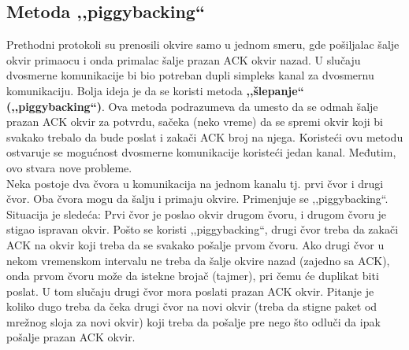 \documentclass[a4paper]{article}
\begin{document}
    \subsection{Metoda ,,piggybacking``}
        Prethodni protokoli su prenosili okvire samo u jednom smeru, gde pošiljalac šalje 
        okvir primaocu i onda primalac šalje prazan ACK okvir nazad. U slučaju dvosmerne komunikacije
        bi bio potreban dupli simpleks kanal za dvosmernu komunikaciju. Bolja ideja je da se
        koristi metoda \textbf{,,šlepanje`` (,,piggybacking``)}. Ova metoda podrazumeva da umesto da se odmah šalje
        prazan ACK okvir za potvrdu, sačeka (neko vreme) da se spremi okvir koji bi svakako trebalo da bude
        poslat i zakači ACK broj na njega. Koristeći ovu metodu ostvaruje se mogućnost dvosmerne
        komunikacije koristeći jedan kanal. Međutim, ovo stvara nove probleme. \\
        \indent Neka postoje dva čvora u komunikacija na jednom kanalu tj. prvi čvor i drugi čvor.
        Oba čvora mogu da šalju i primaju okvire. Primenjuje se ,,piggybacking``. Situacija je sledeća:
        Prvi čvor je poslao okvir drugom čvoru, i drugom čvoru je stigao ispravan okvir. Pošto
        se koristi ,,piggybacking``, drugi čvor treba da zakači ACK na okvir koji treba da se
        svakako pošalje prvom čvoru. Ako drugi čvor u nekom vremenskom intervalu ne treba
        da šalje okvire nazad (zajedno sa ACK), onda prvom čvoru može da istekne brojač (tajmer), pri
        čemu će duplikat biti poslat. U tom slučaju drugi čvor mora poslati prazan ACK okvir. Pitanje 
        je koliko dugo treba da čeka drugi čvor na novi okvir (treba da stigne paket od mrežnog sloja za
        novi okvir) koji treba da pošalje pre nego što odluči da ipak pošalje prazan ACK okvir.
\end{document}
